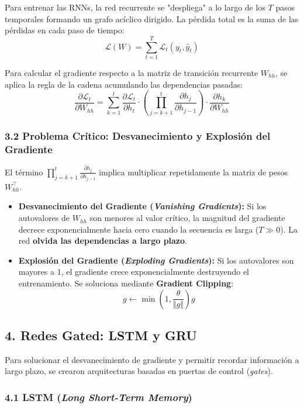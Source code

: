 Para entrenar las RNNs, la red recurrente se "despliega" a lo largo de los $T$ pasos temporales formando un grafo acíclico dirigido. La pérdida total es la suma de las pérdidas en cada paso de tiempo:
$$\mathcal{L}(W) = \sum_{t=1}^{T} \mathcal{L}_t(y_t, \hat{y}_t)$$

Para calcular el gradiente respecto a la matriz de transición recurrente $W_{hh}$, se aplica la regla de la cadena acumulando las dependencias pasadas:
$$\frac{\partial \mathcal{L}_t}{\partial W_{hh}} = \sum_{k=1}^{t} \frac{\partial \mathcal{L}_t}{\partial h_t} \cdot \left( \prod_{j=k+1}^{t} \frac{\partial h_j}{\partial h_{j-1}} \right) \cdot \frac{\partial h_k}{\partial W_{hh}}$$

\subsubsection{3.2 Problema Crítico: Desvanecimiento y Explosión del Gradiente}

El término $\prod_{j=k+1}^{t} \frac{\partial h_j}{\partial h_{j-1}}$ implica multiplicar repetidamente la matriz de pesos $W_{hh}^\top$.

\begin{itemize}
	\item \textbf{Desvanecimiento del Gradiente (\emph{Vanishing Gradients}):} Si los autovalores de $W_{hh}$ son menores al valor crítico, la magnitud del gradiente decrece exponencialmente hacia cero cuando la secuencia es larga ($T \gg 0$). La red \textbf{olvida las dependencias a largo plazo}.
	
	\item \textbf{Explosión del Gradiente (\emph{Exploding Gradients}):} Si los autovalores son mayores a $1$, el gradiente crece exponencialmente destruyendo el entrenamiento. Se soluciona mediante \textbf{Gradient Clipping}:
	$$g \leftarrow \min\left(1, \frac{\theta}{\Vert g\Vert}\right) g$$
\end{itemize}

\subsection{4. Redes Gated: LSTM y GRU}

Para solucionar el desvanecimiento de gradiente y permitir recordar información a largo plazo, se crearon arquitecturas basadas en puertas de control (\emph{gates}).

\subsubsection{4.1 LSTM (\emph{Long Short-Term Memory})}

